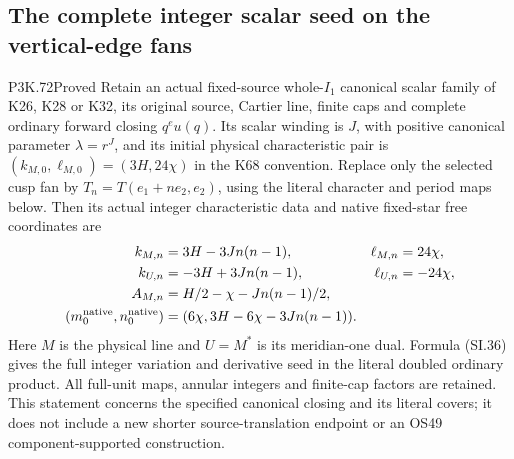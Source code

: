 \subsection{The complete integer scalar seed on the vertical-edge fans}
\begin{statement}{P3K.72}{Proved}
Retain an actual fixed-source whole-\(I_1\) canonical scalar family
of K26, K28 or K32, its original source, Cartier line, finite caps and
complete ordinary forward closing \(q^e u(q)\). Its scalar winding is
\(J\), with positive canonical parameter \(\lambda=r^J\), and its
initial physical characteristic pair is
\((k_{M,0},\ell_{M,0})=(3H,24\chi)\) in the K68 convention.
Replace only the selected cusp fan by
\(T_n=T(e_1+ne_2,e_2)\), using the literal character and period maps
below. Then its actual integer characteristic data and native fixed-star
free coordinates are
\[
\begin{aligned}
k_{M,n}&=3H-3Jn(n-1),&\ell_{M,n}&=24\chi,\\
k_{U,n}&=-3H+3Jn(n-1),&\ell_{U,n}&=-24\chi,\\
A_{M,n}&=H/2-\chi-Jn(n-1)/2,\\
(m_0^{\rm native},n_0^{\rm native})
  &=(6\chi,3H-6\chi-3Jn(n-1)).
\end{aligned}
\]
Here \(M\) is the physical line and \(U=M^*\) is its meridian-one
dual. Formula (SI.36) gives the full integer variation and derivative
seed in the literal doubled ordinary product. All full-unit maps,
annular integers and finite-cap factors are retained. This statement
concerns the specified canonical closing and its literal covers; it
does not include a new shorter source-translation endpoint or an OS49
component-supported construction.
\end{statement}
